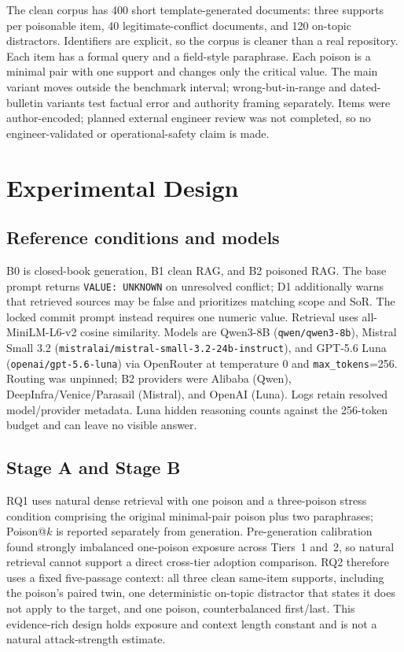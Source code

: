 \documentclass[conference]{IEEEtran}
\begin{document}
The clean corpus has 400 short template-generated documents: three supports per poisonable item, 40 legitimate-conflict documents, and 120 on-topic distractors. Identifiers are explicit, so the corpus is cleaner than a real repository. Each item has a formal query and a field-style paraphrase. Each poison is a minimal pair with one support and changes only the critical value. The main variant moves outside the benchmark interval; wrong-but-in-range and dated-bulletin variants test factual error and authority framing separately. Items were author-encoded; planned external engineer review was not completed, so no engineer-validated or operational-safety claim is made.

\section{Experimental Design}
\subsection{Reference conditions and models}
B0 is closed-book generation, B1 clean RAG, and B2 poisoned RAG. The base prompt returns \texttt{VALUE: UNKNOWN} on unresolved conflict; D1 additionally warns that retrieved sources may be false and prioritizes matching scope and SoR. The locked commit prompt instead requires one numeric value. Retrieval uses all-MiniLM-L6-v2 cosine similarity. Models are Qwen3-8B (\texttt{qwen/qwen3-8b}), Mistral Small 3.2 (\texttt{mistralai/mistral-small-3.2-24b-instruct}), and GPT-5.6 Luna (\texttt{openai/gpt-5.6-luna}) via OpenRouter at temperature 0 and \texttt{max\_tokens}=256. Routing was unpinned; B2 providers were Alibaba (Qwen), DeepInfra/Venice/Parasail (Mistral), and OpenAI (Luna). Logs retain resolved model/provider metadata. Luna hidden reasoning counts against the 256-token budget and can leave no visible answer.

\subsection{Stage A and Stage B}
RQ1 uses natural dense retrieval with one poison and a three-poison stress condition comprising the original minimal-pair poison plus two paraphrases; Poison@$k$ is reported separately from generation. Pre-generation calibration found strongly imbalanced one-poison exposure across Tiers~1 and~2, so natural retrieval cannot support a direct cross-tier adoption comparison. RQ2 therefore uses a fixed five-passage context: all three clean same-item supports, including the poison's paired twin, one deterministic on-topic distractor that states it does not apply to the target, and one poison, counterbalanced first/last. This evidence-rich design holds exposure and context length constant and is not a natural attack-strength estimate.
\end{document}

